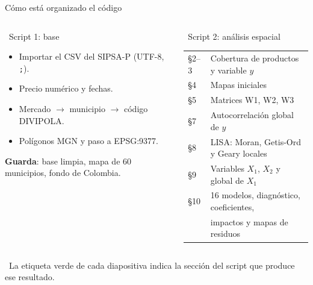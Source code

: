 \documentclass[aspectratio=169,11pt]{beamer}
\begin{document}
\begin{frame}{Cómo está organizado el código}
  \begin{columns}[T]
    \begin{block}{\faFileCode\ Script 1: base}\footnotesize
      \begin{itemize}
        \item Importar el CSV del SIPSA-P (UTF-8, \texttt{;}).
        \item Precio numérico y fechas.
        \item Mercado $\to$ municipio $\to$ código DIVIPOLA.
        \item Polígonos MGN y paso a EPSG:9377.
      \end{itemize}
      \textbf{Guarda}: base limpia, mapa de 60 municipios, fondo de Colombia.
    \end{block}
    \begin{block}{\faFileCode\ Script 2: análisis espacial}\footnotesize
      \begin{tabular}{@{}l l@{}}
        §2--3 & Cobertura de productos y variable $y$ \\
        §4    & Mapas iniciales \\
        §5    & Matrices W1, W2, W3 \\
        §7    & Autocorrelación global de $y$ \\
        §8    & LISA: Moran, Getis-Ord y Geary locales \\
        §9    & Variables $X_1$, $X_2$ y global de $X_1$ \\
        §10   & 16 modelos, diagnóstico, coeficientes, \\
              & impactos y mapas de residuos \\
      \end{tabular}
    \end{block}
  \end{columns}
  {\scriptsize\color{gris}\faCode\ La etiqueta verde de cada diapositiva indica la sección del script que produce ese resultado.}
\end{frame}
\end{document}
